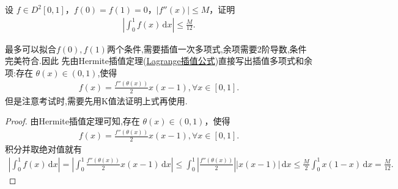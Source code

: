 \documentclass[../../main.tex]{subfiles}%
\begin{document}
\begin{example}
设 $f \in D^2[0,1]$，$f(0) = f(1) = 0$，$|f''(x)| \leqslant  M$，证明
\begin{align*}
\left| \int_{0}^{1} f(x) \, \mathrm{d}x \right| \leqslant  \frac{M}{12}.
\end{align*}
\end{example}
\begin{note}
最多可以拟合$f(0),f(1)$两个条件,需要插值一次多项式,余项需要2阶导数,条件完美符合.因此
先由Hermite插值定理(\hyperref[proposition:Lagrange插值公式]{Lagrange插值公式})直接写出插值多项式和余项:存在 $\theta(x) \in (0,1)$,使得
\begin{align*}
f(x) = \frac{f''(\theta(x))}{2} x (x - 1), \forall x \in [0,1].
\end{align*}
但是注意考试时,需要先用K值法证明上式再使用.
\end{note}
\begin{proof}

由Hermite插值定理可知,存在 $\theta(x) \in (0,1)$，使得
\begin{align*}
f(x) = \frac{f''(\theta(x))}{2} x (x - 1), \forall x \in [0,1].
\end{align*}
积分并取绝对值就有
\begin{align*}
\left| \int_{0}^{1} f(x) \, \mathrm{d}x \right| = \left| \int_{0}^{1} \frac{f''(\theta(x))}{2} x (x - 1) \, \mathrm{d}x \right| \leqslant  \int_{0}^{1} \left| \frac{f''(\theta(x))}{2} \right| \left| x (x - 1) \right| \, \mathrm{d}x 
\leqslant  \frac{M}{2} \int_{0}^{1} x (1 - x) \, \mathrm{d}x = \frac{M}{12}.
\end{align*}

\end{proof}
\end{document}
